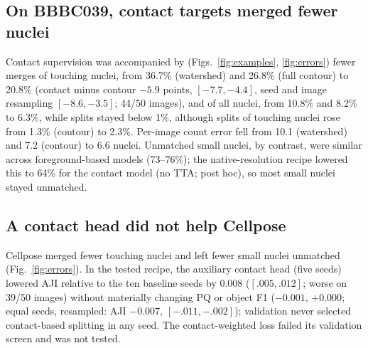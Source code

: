 \documentclass{article}
\begin{document}
\subsection{On BBBC039, contact targets merged fewer nuclei}
Contact supervision was accompanied by (Figs.~\ref{fig:examples}, \ref{fig:errors}) fewer merges of touching nuclei, from 36.7\% (watershed) and 26.8\% (full contour) to 20.8\% (contact minus contour $-5.9$ points, $[-7.7,-4.4]$, seed and image resampling $[-8.6,-3.5]$; 44/50 images), and of all nuclei, from 10.8\% and 8.2\% to 6.3\%, while splits stayed below 1\%, although splits of touching nuclei rose from 1.3\% (contour) to 2.3\%. Per-image count error fell from 10.1 (watershed) and 7.2 (contour) to 6.6 nuclei. Unmatched small nuclei, by contrast, were similar across foreground-based models (73--76\%); the native-resolution recipe lowered this to 64\% for the contact model (no TTA; post hoc), so most small nuclei stayed unmatched.

\subsection{A contact head did not help Cellpose}
Cellpose merged fewer touching nuclei and left fewer small nuclei unmatched (Fig.~\ref{fig:errors}). In the tested recipe, the auxiliary contact head (five seeds) lowered AJI relative to the ten baseline seeds by 0.008 ($[.005,.012]$; worse on 39/50 images) without materially changing PQ or object F1 ($-0.001$, $+0.000$; equal seeds, resampled: AJI $-0.007$, $[-.011,-.002]$); validation never selected contact-based splitting in any seed. The contact-weighted loss failed its validation screen and was not tested.
\end{document}
